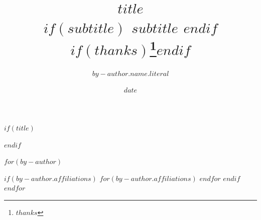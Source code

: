 $if(title)$
\title{
  $title$ \\
  {\large $if(subtitle)$ $subtitle$ $endif$}
  $if(thanks)$\thanks{$thanks$}$endif$
  }
$endif$


$for(by-author)$
  \author{$by-author.name.literal$}
  $if(by-author.affiliations)$
    $for(by-author.affiliations)$
    $endfor$
  $endif$
$endfor$

\date{$date$}
